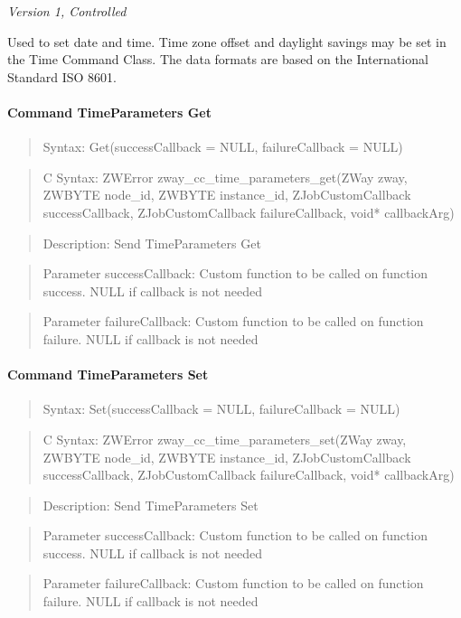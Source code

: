 \textit{Version 1, Controlled}
\newline

Used to set date and time. Time zone offset and daylight savings may be set in the Time Command Class. The data formats are based on the International Standard ISO 8601.
\paragraph{Command TimeParameters Get}
\begin{quote}Syntax: Get(successCallback = NULL, failureCallback = NULL)\end{quote}
\begin{quote}C Syntax: ZWError zway\_cc\_time\_parameters\_get(ZWay zway, ZWBYTE node\_id, ZWBYTE instance\_id, ZJobCustomCallback successCallback, ZJobCustomCallback failureCallback, void* callbackArg)\end{quote}
\begin{quote}Description: Send TimeParameters Get\end{quote}
\begin{quote}Parameter successCallback: Custom function to be called on function success. NULL if callback is not needed\end{quote}
\begin{quote}Parameter failureCallback: Custom function to be called on function failure. NULL if callback is not needed\end{quote}


\paragraph{Command TimeParameters Set}
\begin{quote}Syntax: Set(successCallback = NULL, failureCallback = NULL)\end{quote}
\begin{quote}C Syntax: ZWError zway\_cc\_time\_parameters\_set(ZWay zway, ZWBYTE node\_id, ZWBYTE instance\_id, ZJobCustomCallback successCallback, ZJobCustomCallback failureCallback, void* callbackArg)\end{quote}
\begin{quote}Description: Send TimeParameters Set\end{quote}
\begin{quote}Parameter successCallback: Custom function to be called on function success. NULL if callback is not needed\end{quote}
\begin{quote}Parameter failureCallback: Custom function to be called on function failure. NULL if callback is not needed\end{quote}



